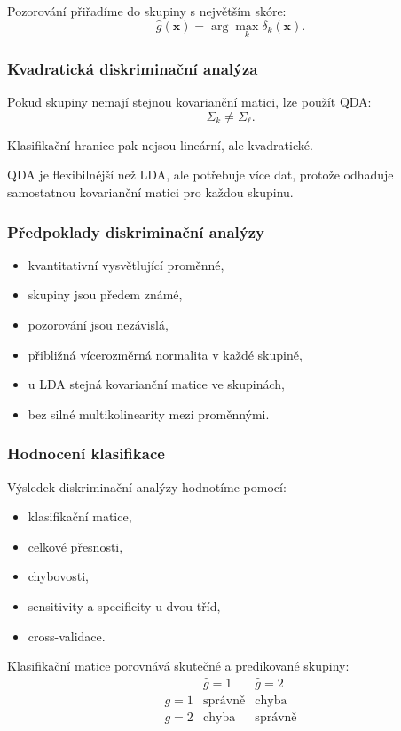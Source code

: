 Pozorování přiřadíme do skupiny s největším skóre:
\[
\hat g(\mathbf{x})
=
\arg\max_k \delta_k(\mathbf{x}).
\]

\subsubsection{Kvadratická diskriminační analýza}

Pokud skupiny nemají stejnou kovarianční matici, lze použít QDA:
\[
\Sigma_k \neq \Sigma_\ell.
\]

Klasifikační hranice pak nejsou lineární, ale kvadratické.

QDA je flexibilnější než LDA, ale potřebuje více dat, protože odhaduje samostatnou kovarianční matici pro
každou skupinu.

\subsubsection{Předpoklady diskriminační analýzy}

\begin{itemize}
    \item kvantitativní vysvětlující proměnné,
    \item skupiny jsou předem známé,
    \item pozorování jsou nezávislá,
    \item přibližná vícerozměrná normalita v každé skupině,
    \item u LDA stejná kovarianční matice ve skupinách,
    \item bez silné multikolinearity mezi proměnnými.
\end{itemize}

\subsubsection{Hodnocení klasifikace}

Výsledek diskriminační analýzy hodnotíme pomocí:
\begin{itemize}
    \item klasifikační matice,
    \item celkové přesnosti,
    \item chybovosti,
    \item sensitivity a specificity u dvou tříd,
    \item cross-validace.
\end{itemize}

Klasifikační matice porovnává skutečné a predikované skupiny:
\[
\begin{array}{c|cc}
 & \hat g=1 & \hat g=2 \\
\hline
g=1 & \text{správně} & \text{chyba} \\
g=2 & \text{chyba} & \text{správně}
\end{array}
\]

